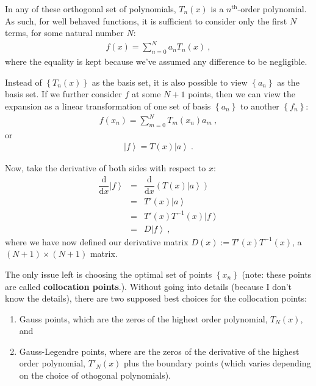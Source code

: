 \documentclass[11pt]{amsdtx}
\newcommand{\ud}{\mathrm{d}}
\newcommand{\ket}[1]{\left| #1 \right\rangle}
\newcommand{\nth}{\mathrm{th}}
\begin{document}
In any of these orthogonal set of polynomials, $T_n(x)$ is a $n^{\nth}$-order polynomial.  As such, for well behaved functions, it is sufficient to consider only the first $N$ terms, for some natural number $N$:
\begin{eqnarray}
	f(x) = \sum_{n = 0}^{N} a_n T_n(x)~,
\end{eqnarray}
where the equality is kept because we've assumed any difference to be negligible.

Instead of $\left\lbrace T_n(x) \right\rbrace$ as the basis set, it is also possible to view $\left\lbrace a_n \right\rbrace$ as the basis set.  If we further consider $f$ at some $N+1$ points, then we can view the expansion as a linear transformation of one set of basis $\left\lbrace a_n \right\rbrace$ to another $\left\lbrace f_n \right\rbrace$:
\begin{eqnarray}
	f(x_n) = \sum_{m=0}^N T_m(x_n) a_m~,
\end{eqnarray}
or
\begin{eqnarray}
	\ket{f} = T(x) \ket{a}~.
\end{eqnarray}

Now, take the derivative of both sides with respect to $x$:
\begin{eqnarray}
	\dfrac{\ud}{\ud x} \ket{f} &=& \dfrac{\ud}{\ud x} \left( T(x) \ket{a} \right) \\
	\ &=& T'(x) \ket{a} \\
	\ &=& T'(x) T^{-1}(x) \ket{f}  \\
	\ &=& D \ket{f}~,
\end{eqnarray}
where we have now defined our derivative matrix $D(x) := T'(x) T^{-1}(x)$, a $(N+1) \times (N+1)$ matrix.

The only issue left is choosing the optimal set of points $\left\lbrace x_n \right\rbrace$ (note: these points are called \textbf{collocation points}.).  Without going into details (because I don't know the details), there are two supposed best choices for the collocation points:
\begin{enumerate}
	\item Gauss points, which are the zeros of the highest order polynomial, $T_N(x)$, and
	\item Gauss-Legendre points, where are the zeros of the derivative of the highest order polynomial, $T'_N(x)$ plus the boundary points (which varies depending on the choice of othogonal polynomials).
\end{enumerate}
\end{document}
